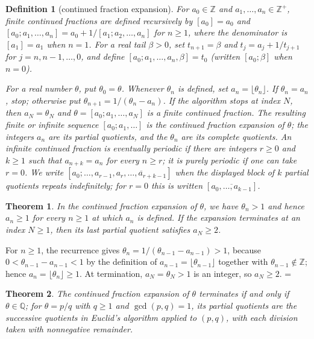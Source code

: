 \documentclass[11pt]{article}
\makeatletter
\theoremstyle{ntstyle}
\newtheorem{theorem}{Theorem}[subsection]
\newtheorem{definition}{Definition}[subsection]
\let\nt@closedisplay\]
\def\nt@guardedclose{\@ifnextchar\par{\nt@closeafterpar}{\@ifnextchar\end{\postdisplaypenalty\@M\nt@closedisplay}{\nt@closedisplay}}}
\def\nt@closeafterpar\par{\@ifnextchar\par{\nt@closeafterpar}{\@ifnextchar\end{\postdisplaypenalty\@M\nt@closedisplay\par}{\nt@closedisplay\par}}}
\renewenvironment{proof}[1][\proofname]{\par
  \pushQED{\qed}\normalfont\topsep\medskipamount\edef\nt@afterproof{\@endparpenalty=\the\@endparpenalty\relax}\@beginparpenalty\@M\@endparpenalty\@M\let\]\nt@guardedclose\trivlist\item[]\textit{#1\@addpunct{.}} \ignorespaces}{\ifvmode\addpenalty\@M\fi\popQED\nt@afterproof\endtrivlist\@endpefalse}
\makeatother
\begin{document}
\begin{definition}[continued fraction expansion]\label{def:10.3.1}
	For $a_0\in\mathbb{Z}$ and $a_1,\ldots,a_n\in\mathbb{Z}^+$, finite
	continued fractions are defined recursively by $[a_0]=a_0$ and
	$[a_0;a_1,\ldots,a_n]=a_0+1/[a_1;a_2,\ldots,a_n]$ for $n\ge1$,
	where the denominator is $[a_1]=a_1$ when $n=1$.
	For a real tail $\beta>0$, set $t_{n+1}=\beta$ and
	$t_j=a_j+1/t_{j+1}$ for $j=n,n-1,\ldots,0$, and define
	$[a_0;a_1,\ldots,a_n,\beta]=t_0$ (written $[a_0;\beta]$ when $n=0$).

	For a real number $\theta$, put $\theta_0=\theta$. Whenever $\theta_n$ is
	defined, set $a_n=\lfloor\theta_n\rfloor$. If $\theta_n=a_n$, stop;
	otherwise put $\theta_{n+1}=1/(\theta_n-a_n)$. If the algorithm stops
	at index $N$, then $a_N=\theta_N$ and
	$\theta=[a_0;a_1,\ldots,a_N]$ is a finite continued fraction.
	The resulting finite or infinite sequence $[a_0;a_1,\ldots]$ is the
	continued fraction expansion
	of $\theta$; the integers $a_n$ are its partial quotients, and the $\theta_n$ are its complete
	quotients. An infinite continued fraction is
	eventually periodic if there are integers $r\ge0$ and $k\ge1$ such that
	$a_{n+k}=a_n$ for every $n\ge r$; it is purely periodic if one can take
	$r=0$. We write
	$[a_0;\ldots,a_{r-1},\overline{a_r,\ldots,a_{r+k-1}}]$ when the displayed
	block of $k$ partial quotients repeats indefinitely; for $r=0$ this is
	written $[\overline{a_0,\ldots,a_{k-1}}]$.
\end{definition}
\begin{theorem}\label{thm:10.3.1}
	In the continued fraction expansion of $\theta$, we have $\theta_n>1$ and
	hence $a_n\ge1$ for every $n\ge1$ at which $a_n$ is defined. If the
	expansion terminates at an index $N\ge1$, then its last partial quotient
	satisfies $a_N\ge2$.
\end{theorem}

\begin{proof} For $n\ge1$, the recurrence gives
	$\theta_n=1/(\theta_{n-1}-a_{n-1})>1$, because
	$0<\theta_{n-1}-a_{n-1}<1$ by the definition of $a_{n-1}=\lfloor
		\theta_{n-1}\rfloor$ together with $\theta_{n-1}\notin\mathbb{Z}$; hence
	$a_n=\lfloor\theta_n\rfloor\ge1$. At termination, $a_N=\theta_N>1$ is an
	integer, so $a_N\ge2$.
\end{proof}
\begin{theorem}\label{thm:10.3.2} The continued fraction expansion of $\theta$
	terminates if and only if $\theta\in\mathbb{Q}$; for $\theta=p/q$
	with $q\ge1$ and $\gcd(p, q)=1$, its partial quotients are the successive quotients in Euclid's
	algorithm applied to $(p,q)$, with each division taken with nonnegative remainder.
\end{theorem}
\end{document}
